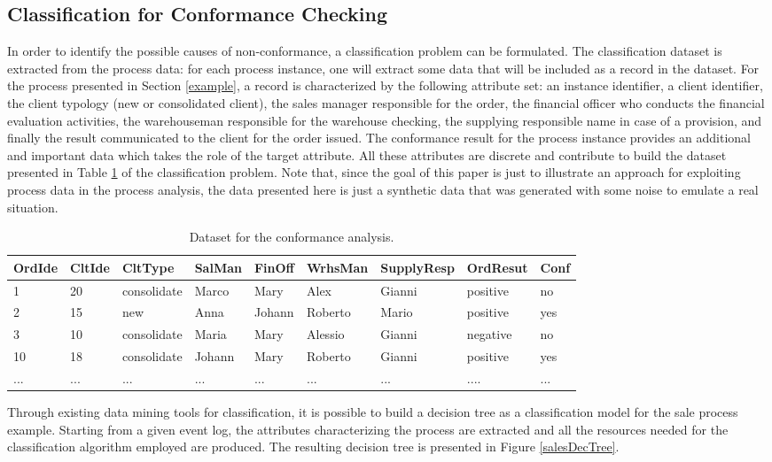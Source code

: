 \documentclass{llncs}
\begin{document}
\subsection{Classification for Conformance Checking}\label{ClassConformance}
In order to identify the possible causes of non-conformance, a classification problem can be formulated. The classification dataset is extracted from the process data: for each process instance, one will extract some data that will be included as a record in the dataset. For the process presented in Section \ref{example}, a record is characterized by the following attribute set: an instance identifier, a client identifier, the client typology (new or consolidated client), the sales manager responsible for the order, the financial officer who conducts the financial evaluation activities, the warehouseman responsible for the warehouse checking, the supplying responsible name in case of a provision, and finally the result communicated to the client for the order issued. The conformance result for the process instance provides an additional and important data which takes the role of the target attribute. All these attributes are discrete and contribute to build the dataset presented in Table \ref{tab:SaleData} of the classification problem. Note that, since the goal of this paper is just to illustrate an approach for exploiting process data in the process analysis, the data presented here is just a synthetic data that was generated with some noise to emulate a real situation.

\begin{table}[!h]
\scriptsize{
\centering
\begin{tabular}{|p{1cm}|p{1cm}|p{}|p{}|p{}|p{}|p{}|p{}|p{}|}
\hline OrdIde & CltIde & CltType & SalMan & FinOff & WrhsMan & SupplyResp & OrdResut & Conf\\
\hline
1 & 20 & consolidate & Marco & Mary & Alex & Gianni & positive & no\\
\hline
2 & 15 & new & Anna & Johann & Roberto & Mario & positive & yes\\
\hline
3 & 10 &consolidate & Maria & Mary & Alessio & Gianni & negative & no\\
\hline
10 & 18 & consolidate & Johann & Mary & Roberto & Gianni & positive & yes \\
\hline
... & ... & ... & ... & ... & ... & ... & .... & ...  \\
\hline
\end{tabular}
}
\caption{Dataset for the conformance analysis.}
\label{tab:SaleData}
\end{table}
\normalsize
Through existing data mining tools for classification, it is possible to build a decision tree as a classification model for the sale process example. Starting from a given event log, the attributes characterizing the process are extracted and all the resources needed for the classification algorithm employed are produced. The resulting decision tree is presented in Figure \ref{salesDecTree}.
\end{document}
